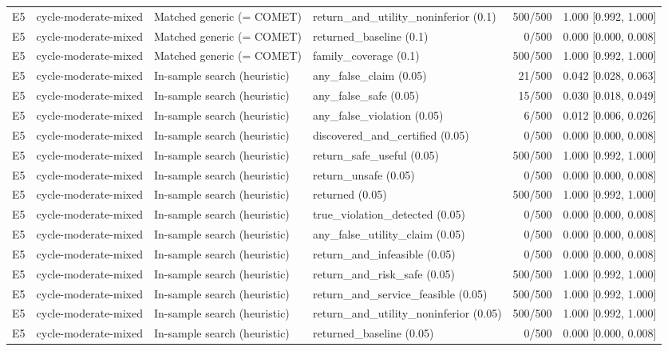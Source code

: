 \begin{longtable}{p{.04\linewidth}p{.18\linewidth}p{.19\linewidth}p{.16\linewidth}r p{.21\linewidth}}
E5 & cycle-moderate-mixed & Matched generic (= COMET) & return\_and\_utility\_noninferior (0.1) & 500/500 & 1.000 [0.992, 1.000]\\
E5 & cycle-moderate-mixed & Matched generic (= COMET) & returned\_baseline (0.1) & 0/500 & 0.000 [0.000, 0.008]\\
E5 & cycle-moderate-mixed & Matched generic (= COMET) & family\_coverage (0.1) & 500/500 & 1.000 [0.992, 1.000]\\
E5 & cycle-moderate-mixed & In-sample search (heuristic) & any\_false\_claim (0.05) & 21/500 & 0.042 [0.028, 0.063]\\
E5 & cycle-moderate-mixed & In-sample search (heuristic) & any\_false\_safe (0.05) & 15/500 & 0.030 [0.018, 0.049]\\
E5 & cycle-moderate-mixed & In-sample search (heuristic) & any\_false\_violation (0.05) & 6/500 & 0.012 [0.006, 0.026]\\
E5 & cycle-moderate-mixed & In-sample search (heuristic) & discovered\_and\_certified (0.05) & 0/500 & 0.000 [0.000, 0.008]\\
E5 & cycle-moderate-mixed & In-sample search (heuristic) & return\_safe\_useful (0.05) & 500/500 & 1.000 [0.992, 1.000]\\
E5 & cycle-moderate-mixed & In-sample search (heuristic) & return\_unsafe (0.05) & 0/500 & 0.000 [0.000, 0.008]\\
E5 & cycle-moderate-mixed & In-sample search (heuristic) & returned (0.05) & 500/500 & 1.000 [0.992, 1.000]\\
E5 & cycle-moderate-mixed & In-sample search (heuristic) & true\_violation\_detected (0.05) & 0/500 & 0.000 [0.000, 0.008]\\
E5 & cycle-moderate-mixed & In-sample search (heuristic) & any\_false\_utility\_claim (0.05) & 0/500 & 0.000 [0.000, 0.008]\\
E5 & cycle-moderate-mixed & In-sample search (heuristic) & return\_and\_infeasible (0.05) & 0/500 & 0.000 [0.000, 0.008]\\
E5 & cycle-moderate-mixed & In-sample search (heuristic) & return\_and\_risk\_safe (0.05) & 500/500 & 1.000 [0.992, 1.000]\\
E5 & cycle-moderate-mixed & In-sample search (heuristic) & return\_and\_service\_feasible (0.05) & 500/500 & 1.000 [0.992, 1.000]\\
E5 & cycle-moderate-mixed & In-sample search (heuristic) & return\_and\_utility\_noninferior (0.05) & 500/500 & 1.000 [0.992, 1.000]\\
E5 & cycle-moderate-mixed & In-sample search (heuristic) & returned\_baseline (0.05) & 0/500 & 0.000 [0.000, 0.008]\\

\end{longtable}
